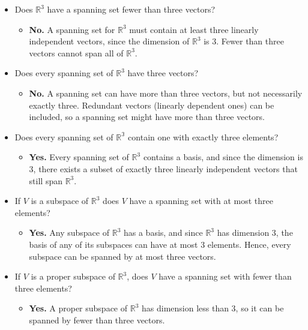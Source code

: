 \documentclass[a4paper, 9pt]{extarticle}
\begin{document}
\begin{itemize}

  \item Does $\mathbb{R}^3$ have a spanning set fewer than three vectors?
        \begin{itemize}
          \item \textbf{No.} A spanning set for $\mathbb{R}^3$ must contain at least three linearly independent vectors, since the dimension of $\mathbb{R}^3$ is 3. Fewer than three vectors cannot span all of $\mathbb{R}^3$.
        \end{itemize}
  \item Does every spanning set of $\mathbb{R}^3$ have three vectors?
        \begin{itemize}
          \item \textbf{No.} A spanning set can have more than three vectors, but not necessarily exactly three. Redundant vectors (linearly dependent ones) can be included, so a spanning set might have more than three vectors.
        \end{itemize}
  \item Does every spanning set of $\mathbb{R^3}$ contain one with exactly three elements?
        \begin{itemize}
          \item \textbf{Yes.} Every spanning set of $\mathbb{R}^3$ contains a basis, and since the dimension is 3, there exists a subset of exactly three linearly independent vectors that still span $\mathbb{R}^3$.
        \end{itemize}
  \item If $V$ is a subspace of $\mathbb{R}^3$ does $V$ have a spanning set with at most three elements?
        \begin{itemize}
          \item \textbf{Yes.} Any subspace of $\mathbb{R}^3$ has a basis, and since $\mathbb{R}^3$ has dimension 3, the basis of any of its subspaces can have at most 3 elements. Hence, every subspace can be spanned by at most three vectors.
        \end{itemize}
  \item If $V$ is a proper subspace of $\mathbb{R}^3$, does $V$ have a spanning set with fewer than three elements?
        \begin{itemize}
          \item \textbf{Yes.} A proper subspace of $\mathbb{R}^3$ has dimension less than 3, so it can be spanned by fewer than three vectors.
        \end{itemize}
\end{itemize}
\end{document}
